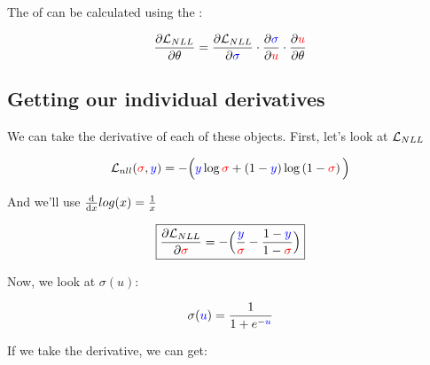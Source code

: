         \begin{kequation}
            The  of  can be calculated using the :
            
            \begin{equation}
                \frac{\partial  \mathcal{L}_{NLL} }{\partial  \theta } 
                = 
                \frac{\partial  \mathcal{L}_{NLL} }{\partial \textcolor{blue}{\sigma}} 
                \cdot 
                \frac{\partial  \textcolor{blue}{\sigma} }{\partial \textcolor{red}{u}} 
                \cdot 
                \frac{\partial \textcolor{red}{u}}{\partial \theta}
            \end{equation}
        \end{kequation}
        
    \subsection{Getting our individual derivatives}
    
        We can take the derivative of each of these objects. First, let's look at $\mathcal{L}_{NLL}$
        
        \begin{equation*}
            \mathcal{L}_{nll}
            (\textcolor{red}{\sigma}, \textcolor{blue}{y})
            =
            -
            \Big(
                \textcolor{blue}{y} \log{ \textcolor{red}{\sigma} }
                +
                \left( 1 - \textcolor{blue}{y} \right)
                \log
                \left( 1 - \textcolor{red}{\sigma} \right) 
            \Big)
        \end{equation*}
        
        And we'll use $\frac{\dd }{\dd x} log(x) = \frac{1}{x}$
        
        \begin{equation}
        \boxed{
            \frac{\partial  \mathcal{L}_{NLL} }{\partial \textcolor{red}{\sigma}} =
            -
            \Big(
                \frac{ \textcolor{blue}{y} } { \textcolor{red}{\sigma} } 
                -
                \frac{ 1-\textcolor{blue}{y} } { 1 - \textcolor{red}{\sigma} }
            \Big)
        }
        \end{equation}

        \subsecdiv
        
        Now, we look at $\sigma(u)$:
        
        \begin{equation}
            \sigma(\textcolor{blue}{u}) = \frac{1}{1+e^{-\textcolor{blue}{u} }}
        \end{equation}
        
        If we take the derivative, we can get:
        
